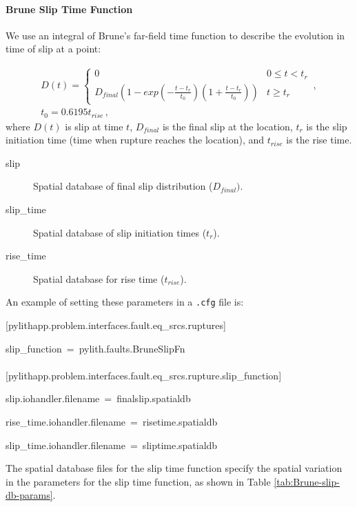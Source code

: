 \paragraph{Brune Slip Time Function}

We use an integral of Brune's far-field time function \cite{Brune:1970}
to describe the evolution in time of slip at a point: 

\begin{gather}
D(t)=\left\{ \begin{array}{cc}
0 & 0\leq t<t_{r}\\
D_{final}\left(1-exp\left(-\frac{t-t_{r}}{t_{0}}\right)\left(1+\frac{t-t_{r}}{t_{0}}\right)\right) & t\ge t_{r}
\end{array}\right.\,,\\
t_{0}=0.6195t_{\mathit{rise}}\,,
\end{gather}
where $D(t)$ is slip at time $t$, $D_{final}$ is the final slip
at the location, $t_{r}$ is the slip initiation time (time when rupture
reaches the location), and $t_{\mathit{rise}}$ is the rise time.
\begin{description}
\item [{slip}] Spatial database of final slip distribution ($D_{final})$.
\item [{slip\_time}] Spatial database of slip initiation times ($t_{r}$).
\item [{rise\_time}] Spatial database for rise time ($t_{\mathit{rise}}$).
\end{description}
An example of setting these parameters in a \texttt{.cfg} file is:
\begin{lyxcode}
{[}pylithapp.problem.interfaces.fault.eq\_srcs.ruptures{]}

slip\_function~=~pylith.faults.BruneSlipFn~\\
~\\
{[}pylithapp.problem.interfaces.fault.eq\_srcs.rupture.slip\_function{]}

slip.iohandler.filename~=~finalslip.spatialdb

rise\_time.iohandler.filename~=~risetime.spatialdb

slip\_time.iohandler.filename~=~sliptime.spatialdb
\end{lyxcode}
The spatial database files for the slip time function specify the
spatial variation in the parameters for the slip time function, as
shown in Table \vref{tab:Brune-slip-db-params}.

